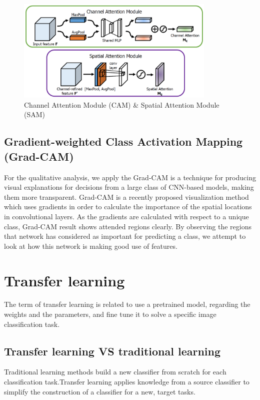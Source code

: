 \begin{figure}[H]
    \centering
    \includegraphics[width=0.85\textwidth]{chapters/chapter02/fig02/cbam2.PNG}
    \caption{Channel Attention Module (CAM) & Spatial Attention Module (SAM)}
\end{figure}

\subsection{Gradient-weighted Class Activation Mapping (Grad-CAM)}
For the qualitative analysis, we apply the Grad-CAM \cite{art45} 
is a technique for producing visual explanations for decisions from a large class of CNN-based models, making them more transparent.
 Grad-CAM is a recently proposed
visualization method which uses gradients in order to calculate the importance
of the spatial locations in convolutional layers. As the gradients are calculated with respect to a unique class, Grad-CAM result shows attended regions clearly.
By observing the regions that network has considered as important for predicting
a class, we attempt to look at how this network is making good use of features.


\section{Transfer learning}
\label{Transfer learning}
The term of transfer learning is related to use a pretrained model, regarding the
weights and the parameters, and fine tune it to solve a specific image classification task.
\subsection{Transfer learning VS traditional learning}
Traditional learning methods build a new classifier from scratch for each classification
task.Transfer learning applies knowledge from a source classifier to simplify the
construction of a classifier for a new, target tasks. \cite{book5}

